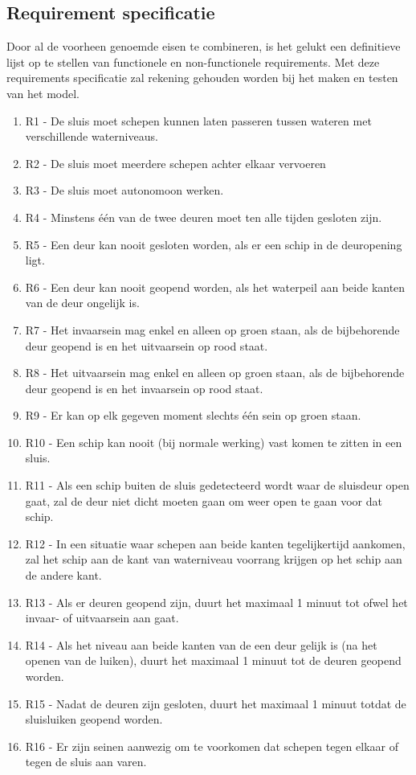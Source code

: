 \documentclass{article} %
\begin{document}
\subsection{Requirement specificatie} \label{paragraaf 2.4}
Door al de voorheen genoemde eisen te combineren, is het gelukt een definitieve lijst op te stellen van functionele en non-functionele requirements. Met deze requirements specificatie zal rekening gehouden worden bij het maken en testen van het model. 
\begin{enumerate}
    \item R1 - De sluis moet schepen kunnen laten passeren tussen wateren met verschillende waterniveaus.
    \item R2 - De sluis moet meerdere schepen achter elkaar vervoeren
    \item R3 - De sluis moet autonomoon werken.
    \item R4 - Minstens één van de twee deuren moet ten alle tijden gesloten zijn.
    \item R5 - Een deur kan nooit gesloten worden, als er een schip in de deuropening ligt.
    \item R6 - Een deur kan nooit geopend worden, als het waterpeil aan beide kanten van de deur ongelijk is.
    \item R7 - Het invaarsein mag enkel en alleen op groen staan, als de bijbehorende deur geopend is en het uitvaarsein op rood staat.
    \item R8 - Het uitvaarsein mag enkel en alleen op groen staan, als de bijbehorende deur geopend is en het invaarsein op rood staat.
    \item R9 - Er kan op elk gegeven moment slechts één sein op groen staan.
    \item R10 - Een schip kan nooit (bij normale werking) vast komen te zitten in een sluis.
    \item R11 - Als een schip buiten de sluis gedetecteerd wordt waar de sluisdeur open gaat, zal de deur niet dicht moeten gaan om weer open te gaan voor dat schip.
    \item R12 - In een situatie waar schepen aan beide kanten tegelijkertijd aankomen, zal het schip aan de kant van waterniveau voorrang krijgen op het schip aan de andere kant.
    \item R13 - Als er deuren geopend zijn, duurt het maximaal 1 minuut tot ofwel het invaar- of uitvaarsein aan gaat.
    \item R14 - Als het niveau aan beide kanten van de een deur gelijk is (na het openen van de luiken), duurt het maximaal 1 minuut tot de deuren geopend worden.
    \item R15 - Nadat de deuren zijn gesloten, duurt het maximaal 1 minuut totdat de sluisluiken geopend worden.
    \item R16 - Er zijn seinen aanwezig om te voorkomen dat schepen tegen elkaar of tegen de sluis aan varen.
\end{enumerate}
\newpage
\end{document}
